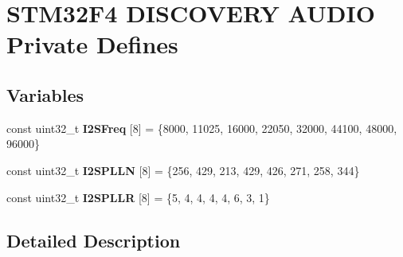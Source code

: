 \hypertarget{group___s_t_m32_f4___d_i_s_c_o_v_e_r_y___a_u_d_i_o___private___defines}{}\section{S\+T\+M32\+F4 D\+I\+S\+C\+O\+V\+E\+RY A\+U\+D\+IO Private Defines}
\label{group___s_t_m32_f4___d_i_s_c_o_v_e_r_y___a_u_d_i_o___private___defines}
\subsection*{Variables}
\begin{DoxyCompactItemize}
\item 
\mbox{\label{group___s_t_m32_f4___d_i_s_c_o_v_e_r_y___a_u_d_i_o___private___defines_gaba0203367c6fd8f057604f9e0eb8e66f}} 
const uint32\+\_\+t {\bfseries I2\+S\+Freq} \mbox{[}8\mbox{]} = \{8000, 11025, 16000, 22050, 32000, 44100, 48000, 96000\}
\item 
\mbox{\label{group___s_t_m32_f4___d_i_s_c_o_v_e_r_y___a_u_d_i_o___private___defines_ga2154c85fd432efa3153888bfd7d19fd1}} 
const uint32\+\_\+t {\bfseries I2\+S\+P\+L\+LN} \mbox{[}8\mbox{]} = \{256, 429, 213, 429, 426, 271, 258, 344\}
\item 
\mbox{\label{group___s_t_m32_f4___d_i_s_c_o_v_e_r_y___a_u_d_i_o___private___defines_ga7ba5fa9689548b002ab0ad10cec51ff0}} 
const uint32\+\_\+t {\bfseries I2\+S\+P\+L\+LR} \mbox{[}8\mbox{]} = \{5, 4, 4, 4, 4, 6, 3, 1\}
\end{DoxyCompactItemize}


\subsection{Detailed Description}
